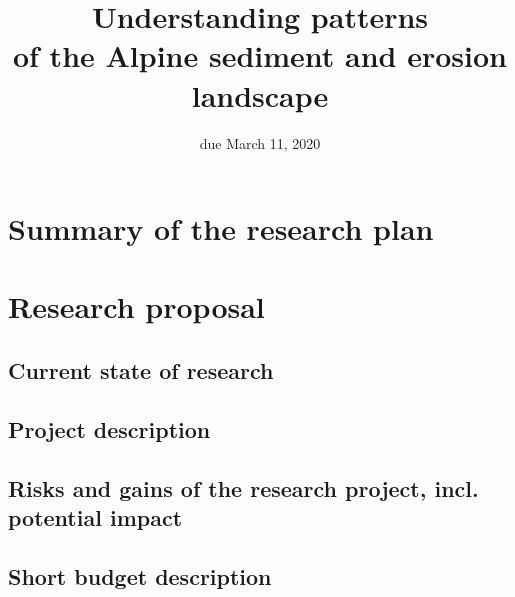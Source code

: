 \documentclass{article}
\title{Understanding patterns\\of the Alpine sediment and erosion landscape}
\author{}
\date{due March 11, 2020}
\begin{document}

\maketitle

\section{Summary of the research plan}



\section{Research proposal}

\subsection{Current state of research}

\subsection{Project description}

\subsection{Risks and gains of the research project, incl. potential impact}

\subsection{Short budget description}


\end{document}
